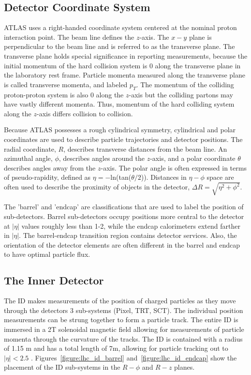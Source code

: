\subsection{Detector Coordinate System}

ATLAS uses a right-handed  coordinate system centered at the nominal proton interaction point. The beam line defines the $z$-axis. The $x-y$ plane is perpendicular to the beam line and is referred to as the transverse plane. The transverse plane holds special significance in reporting measurements, because the initial momentum of the hard collision system is 0 along the transverse plane in the laboratory rest frame. Particle momenta measured along the transverse plane is called transverse momenta, and labeled $p_T$.  The momentum of the colliding proton-proton system is also 0 along the $z$-axis but the colliding partons may have vastly different momenta. Thus, momentum of the hard colliding system along the $z$-axis differs collision to collision. 

Because ATLAS possesses a rough cylindrical symmetry, cylindrical and polar coordinates are used to describe particle trajectories and detector positions. The radial coordinate, $R$, describes transverse distances from the beam line. An azimuthal angle, $\phi$, describes angles around the $z$-axis, and a polar coordinate $\theta$ describes angles away from the $z$-axis. The polar angle is often expressed in terms of pseudo-rapidity, defined as $\eta=-$ln(tan($\theta/2$)). Distances in $\eta-\phi$ space are often used to describe the proximity of objects in the detector, $\Delta R = \sqrt{\eta^2 + \phi^2}$.

The 'barrel' and 'endcap' are classifications that are used to label the position of sub-detectors. Barrel sub-detectors occupy positions more central to the detector at $|\eta|$ values roughly less than 1-2, while the endcap calorimeters extend farther in $|\eta|$. The barrel-endcap transition region contains detector services. Also, the orientation of the detector elements are often different in the barrel and endcap to have optimal particle flux.  

\subsection{The Inner Detector}

The ID makes measurements of the position of charged particles as they move through the detectors 3 sub-systems (Pixel, TRT, SCT). The individual position measurements can be strung together to form a particle track. The entire ID is immersed in a 2T solenoidal magnetic field allowing for measurements of particle momenta through the curvature of the tracks. The ID is contained with a radius of 1.15 m and has a total length of 7m, allowing for particle tracking out to $|\eta| < 2.5$ . Figures~\ref{figure:lhc_id_barrel} and~\ref{figure:lhc_id_endcap} show the placement of the ID sub-systems in the $R-\phi$ and $R-z$ planes.  


